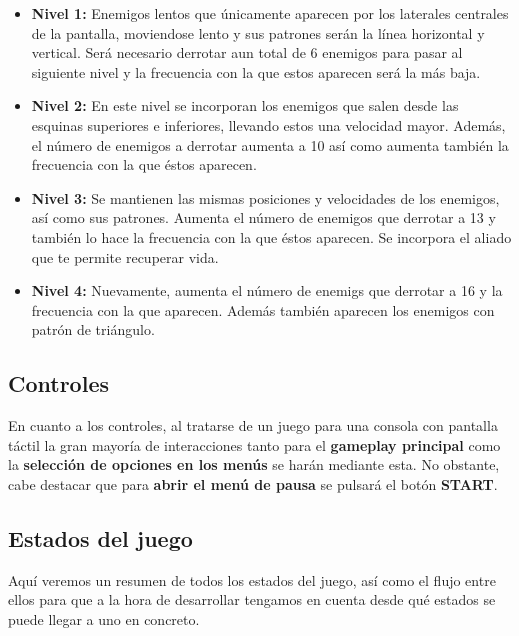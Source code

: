 \begin{itemize}
  \item \textbf{Nivel 1:} Enemigos lentos que únicamente aparecen por los laterales centrales de la pantalla, moviendose lento y sus patrones serán la línea horizontal y vertical. Será necesario derrotar aun total de 6 enemigos para pasar al siguiente nivel y la frecuencia con la que estos aparecen será la más baja.
  
    \item \textbf{Nivel 2:} En este nivel se incorporan los enemigos que salen desde las esquinas superiores e inferiores, llevando estos una velocidad mayor. Además, el número de enemigos a derrotar aumenta a 10 así como aumenta también la frecuencia con la que éstos aparecen.
    
    
    \item \textbf{Nivel 3:} Se mantienen las mismas posiciones y velocidades de los enemigos, así como sus patrones. Aumenta el número de enemigos que derrotar a 13 y también lo hace la frecuencia con la que éstos aparecen. Se incorpora el aliado que te permite recuperar vida.
    
    
    \item \textbf{Nivel 4:} Nuevamente, aumenta el número de enemigs que derrotar a 16 y la frecuencia con la que aparecen. Además también aparecen los enemigos con patrón de triángulo.
    
\end{itemize}

\subsection{Controles}

En cuanto a los controles, al tratarse de un juego para una consola con pantalla táctil la gran mayoría de interacciones tanto para el \textbf{gameplay principal} como la \textbf{selección de opciones en los menús} se harán mediante esta. No obstante, cabe destacar que para \textbf{abrir el menú de pausa} se pulsará el botón \textbf{START}.

\subsection{Estados del juego}
 Aquí veremos un resumen de todos los estados del juego, así como el flujo entre ellos para que a la hora de desarrollar tengamos en cuenta desde qué estados se puede llegar a uno en concreto. 
 
 \vspace{0.5cm}
 
